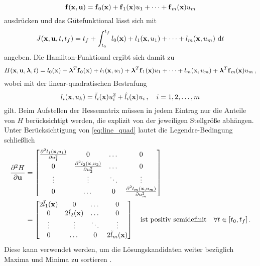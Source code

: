 \begin{equation}
\boldsymbol{\mathrm{f}}(\boldsymbol{\mathrm{x}},\boldsymbol{\mathrm{u}}) = \boldsymbol{\mathrm{f}}_0(\boldsymbol{\mathrm{x}})+\boldsymbol{\mathrm{f}}_1(\boldsymbol{\mathrm{x}})u_1+\dots+\boldsymbol{\mathrm{f}}_m(\boldsymbol{\mathrm{x}})u_m
\end{equation}
ausdrücken und das Gütefunktional lässt sich mit
\begin{equation}
J(\boldsymbol{\mathrm{x}},\boldsymbol{\mathrm{u}},t,t_f) = t_f + \int_{t_0}^{t_f} l_0(\boldsymbol{\mathrm{x}}) + l_1(\boldsymbol{\mathrm{x}},u_1) + \dots + l_m(\boldsymbol{\mathrm{x}},u_m)~\textrm{d}{t}
\end{equation}
angeben. Die Hamilton-Funktional ergibt sich damit zu
\begin{equation}
	H(\boldsymbol{\mathrm{x}},\boldsymbol{\mathrm{u}},\boldsymbol{\mathrm{\lambda}},t) = l_0(\boldsymbol{\mathrm{x}}) + \boldsymbol{\mathrm{\lambda}}^T\boldsymbol{\mathrm{f}}_0(\boldsymbol{\mathrm{x}}) + l_1(\boldsymbol{\mathrm{x}},u_1) + \boldsymbol{\mathrm{\lambda}}^T\boldsymbol{\mathrm{f}}_1(\boldsymbol{\mathrm{x}})u_1 + \dots + l_m(\boldsymbol{\mathrm{x}},u_m) + \boldsymbol{\mathrm{\lambda}}^T\boldsymbol{\mathrm{f}}_m(\boldsymbol{\mathrm{x}})u_m \,,
\end{equation}
wobei mit der linear-quadratischen Bestrafung 
\begin{equation}
l_i(\boldsymbol{\mathrm{x}},u_k) = \tilde{l}_i(\boldsymbol{\mathrm{x}})u_i^2 + \hat{l}_i(\boldsymbol{\mathrm{x}})u_i\,, \quad i = 1,2,\dots,m \label{eq:line_quad}
\end{equation}
gilt. Beim Aufstellen der Hessematrix müssen in jedem Eintrag nur die Anteile von $H$ berücksichtigt werden, die explizit von der jeweiligen Stellgröße abhängen. Unter Berücksichtigung von \eqref{eq:line_quad} lautet die Legendre-Bedingung schließlich
\begin{align}
\frac{\partial^2 H}{\partial \boldsymbol{\mathrm{u}}} &= 
\begin{bmatrix}
\frac{\partial^2 l_1(\boldsymbol{\mathrm{x}},u_1)}{\partial u_1^2} & 0 &  \dots & 0 \\
0 & \frac{\partial^2 l_2(\boldsymbol{\mathrm{x}},u_2)}{\partial u_2^2} & \dots & 0 \\
\vdots & \vdots & \ddots & \vdots \\
0 & \dots & 0 & \frac{\partial^2 l_m(\boldsymbol{\mathrm{x}},u_m)}{\partial u_m^2}
\end{bmatrix} \\
 &= 
\begin{bmatrix}
	2\tilde{l}_1(\boldsymbol{\mathrm{x}}) & 0 &  \dots & 0 \\
	0 & 2\tilde{l}_2(\boldsymbol{\mathrm{x}}) & \dots & 0 \\
	\vdots & \vdots & \ddots & \vdots \\
	0 & \dots & 0 & 2\tilde{l}_m(\boldsymbol{\mathrm{x}})
\end{bmatrix} \quad \textrm{ist positiv semidefinit} \quad \forall t \in[t_0,t_f] \,.
\end{align} 
Diese kann verwendet werden, um die Lösungskandidaten weiter bezüglich Maxima und Minima zu sortieren \cite{Papageorgiou.2012}.
